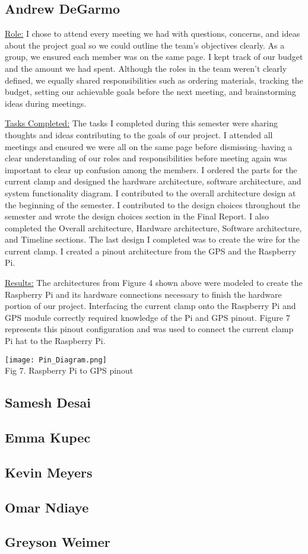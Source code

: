 \subsection{Andrew DeGarmo}
\underline{Role:} I chose to attend every meeting we had with questions, concerns, and ideas about the project goal so we could outline the team’s objectives clearly. 
As a group, we ensured each member was on the same page. 
I kept track of our budget and the amount we had spent. 
Although the roles in the team weren’t clearly defined, we equally shared responsibilities such as ordering materials, tracking the budget, setting our achievable goals before the next meeting, and brainstorming ideas during meetings.

\underline{Tasks Completed:} The tasks I completed during this semester were sharing thoughts and ideas contributing to the goals of our project. 
I attended all meetings and ensured we were all on the same page before dismissing–having a clear understanding of our roles and responsibilities before meeting again was important to clear up confusion among the members. 
I ordered the parts for the current clamp and designed the hardware architecture, software architecture, and system functionality diagram. 
I contributed to the overall architecture design at the beginning of the semester. 
I contributed to the design choices throughout the semester and wrote the design choices section in the Final Report. 
I also completed the Overall architecture, Hardware architecture, Software architecture, and Timeline sections. 
The last design I completed was to create the wire for the current clamp. 
I created a pinout architecture from the GPS and the Raspberry Pi.

\underline{Results:} The architectures from Figure 4 shown above were modeled to create the Raspberry Pi and its hardware connections necessary to finish the hardware portion of our project. 
Interfacing the current clamp onto the Raspberry Pi and GPS module correctly required knowledge of the Pi and GPS pinout. 
Figure 7 represents this pinout configuration and was used to connect the current clamp Pi hat to the Raspberry Pi.

\begin{center}
    \texttt{[image: Pin\_Diagram.png]}\\
    Fig 7. Raspberry Pi to GPS pinout
\end{center}

\subsection{Samesh Desai}

\subsection{Emma Kupec}

\subsection{Kevin Meyers}

\subsection{Omar Ndiaye}

\subsection{Greyson Weimer}